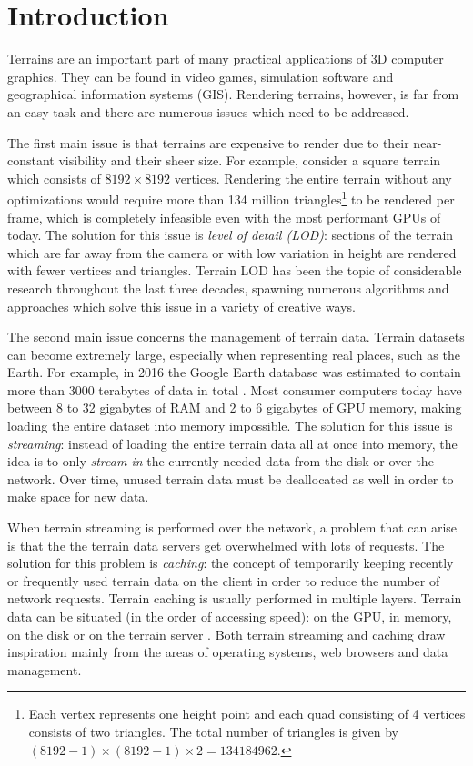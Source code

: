 \chapter{Introduction}
Terrains are an important part of many practical applications of 3D computer graphics.
They can be found in video games, simulation software and geographical information systems (GIS).
Rendering terrains, however, is far from an easy task
and there are numerous issues which need to be addressed.

The first main issue is that terrains are expensive to render 
due to their near-constant visibility 
and their sheer size. For example, 
consider a square terrain which consists of 
$8192 \times 8192$ vertices.
Rendering the entire terrain without any optimizations would require 
more than 134 million triangles\footnote{Each vertex represents one height point and each quad consisting of 4 vertices consists of two triangles. The total number of triangles is given by $(8192 - 1) \times (8192 - 1) \times 2 = 134184962$.} 
to be rendered per frame, which is completely infeasible 
even with the most performant GPUs of today. 
The solution for this issue is \textit{level of detail (LOD)}: 
sections of the terrain which are far away from the camera or with low variation in height 
are rendered with fewer vertices and triangles.
Terrain LOD has been the topic of considerable research throughout 
the last three decades, spawning numerous 
algorithms and approaches which solve this issue 
in a variety of creative ways. 

The second main issue concerns the management of terrain data.
Terrain datasets can become extremely large, especially 
when representing real places, such as the Earth.
For example, in 2016 the Google Earth database was estimated to 
contain more than 3000 terabytes of data in total \cite{googleearthdatabase}.
Most consumer computers today have 
between 8 to 32 gigabytes of RAM and 2 to 6 gigabytes of GPU memory,
making loading the entire dataset into memory impossible.
The solution for this issue is \textit{streaming}: instead of 
loading the entire terrain data all at once into memory,
the idea is to only \textit{stream in}
the currently needed data from the disk or over the network.
Over time, unused terrain data must be deallocated
as well in order to make space for new data.

When terrain streaming is performed over the network, 
a problem that can arise is that the 
the terrain data servers get overwhelmed with lots of requests.
The solution for this problem is \textit{caching}:
the concept of temporarily keeping recently or frequently used 
terrain data on the client in order to reduce 
the number of network requests. Terrain caching is usually 
performed in multiple layers. Terrain data can 
be situated (in the order of accessing speed):
on the GPU, in memory, on the disk or on the terrain server \cite[p.~382]{3denginedesignforvirtualglobes}.
Both terrain streaming and caching draw inspiration mainly from 
the areas of operating systems, web browsers and data management.

